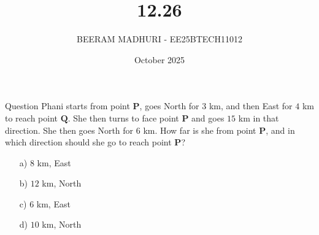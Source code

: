 \documentclass{beamer}
\title %
{12.26}
\date{October  2025}
\author %
{BEERAM MADHURI - EE25BTECH11012}
\begin{document}
\frame{\titlepage}
\begin{frame}{Question}
Phani starts from point $\mathbf{P}$, goes North for $3$ km, and then East for $4$ km to reach point $\mathbf{Q}$. She then turns to face point $\mathbf{P}$ and goes $15$ km in that direction. She then goes North for $6$ km. How far is she from point $\mathbf{P}$, and in which direction should she go to reach point $\mathbf{P}$?

\begin{enumerate}
    \item[a)] $8$ km, East
    \item[b)] $12$ km, North
    \item[c)] $6$ km, East
    \item[d)] $10$ km, North
\end{enumerate}
\end{frame}
 
\end{document}
